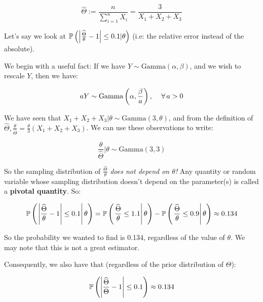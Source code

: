 \documentclass[a4paper]{article}
\begin{document}
                \[
                    \widehat \Theta := \frac{n}{\sum\limits_{i=1}^n X_i} =
                    \frac{3}{X_1 + X_2 + X_3}
                \]

                Let's say we look at $\mathbb{P}\left(\left|\frac{\widehat \Theta}
                {\theta} - 1\right| \leq 0.1 | \theta\right)$ (i.e: the relative
                error instead of the absolute).

                We begin with a useful fact: If we have $Y \sim
                \text{Gamma}(\alpha, \beta)$, and we wish to rescale $Y$, then
                we have:

                \[
                    aY \sim \text{Gamma}\left(\alpha, \frac{\beta}{a}\right),
                    \quad \,\forall\, a > 0
                \]

                We have seen that $X_1 + X_2 + X_3 | \theta \sim \text{Gamma}(3,
                \theta)$, and from the definition of $\widehat \Theta,
                \frac{\theta}{\widehat \Theta} = \frac{\theta}{3}(X_1 + X_2 +
                X_3)$. We can use these observations to write:

                \[
                    \frac{\theta}{\widehat \Theta} | \theta \sim \text{Gamma}(3,
                    3)
                \]

                So the sampling distribution of $\frac{\widehat \Theta}{\theta}$
                \textit{does not depend on $\theta$!} Any quantity or random
                variable whose sampling distribution doesn't depend on the
                parameter(s) is called a \textbf{pivotal quantity}. So:

                \[
                    \mathbb{P}\left(\left.\left|\frac{\widehat \Theta}{\theta} -
                    1\right| \leq 0.1 \right| \theta\right) = \mathbb{P}\left(\left.
                    \frac{\widehat\Theta}{\theta} \leq 1.1 \right| \theta\right)
                    - \mathbb{P}\left(\left.\frac{\widehat\Theta}{\theta} \leq 0.9
                    \right| \theta\right) \approx 0.134
                \]

                So the probability we wanted to find is 0.134, regardless of the
                value of $\theta$. We may note that this is not a great
                estimator.

                Consequently, we also have that (regardless of the prior
                distribution of $\Theta$):

                \[
                    \mathbb{P}\left(\left|\frac{\widehat \Theta}{\Theta} - 1\right|
                    \leq 0.1\right) \approx 0.134
                \]
\end{document}
